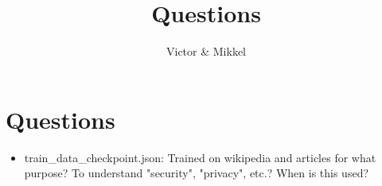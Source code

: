 \documentclass{article}
\begin{document}
\title{Questions}
\author{Victor \& Mikkel}

\maketitle

\section{Questions}
\begin{itemize}
	\item train\_data\_checkpoint.json:
	Trained on wikipedia and articles for what purpose?
	To understand "security", "privacy", etc.?
	When is this used?

\end{itemize}
\end{document}

